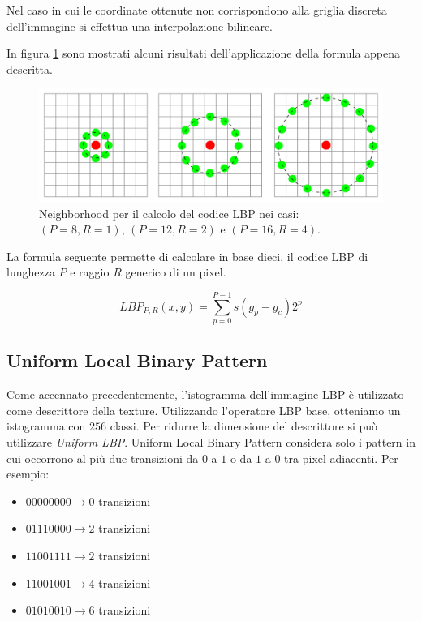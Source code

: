 Nel caso in cui le coordinate ottenute non corrispondono alla griglia discreta dell'immagine si effettua una interpolazione bilineare.

In figura \ref{fig:NeighborhoodLBP} sono mostrati alcuni risultati dell'applicazione della formula appena descritta. \\

\begin{figure}[ht]
\begin{center}
\includegraphics[width=.95\textwidth]{img/raggio_LBP}
\caption{ Neighborhood per il calcolo del codice LBP nei casi: $(P=8, R=1)$, $(P=12, R=2)$ e $(P=16, R=4)$. }
\label{fig:NeighborhoodLBP}
\end{center}
\end{figure}


La formula seguente permette di calcolare in base dieci, il codice LBP di lunghezza $P$ e raggio $R$ generico di un pixel.

\begin{equation}
LBP_{P,R}(x, y) = \sum_{p=0}^{P-1}{s(g_p - g_c)2^p}
\end{equation}

\subsection{Uniform Local Binary Pattern}
Come accennato precedentemente, l'istogramma dell'immagine LBP è utilizzato come descrittore della texture. Utilizzando l'operatore LBP base, otteniamo un istogramma con $256$ classi. Per ridurre la dimensione del descrittore si può utilizzare \textit{Uniform LBP}. Uniform Local Binary Pattern considera solo i pattern in cui occorrono al più due transizioni da $0$ a $1$ o da $1$ a $0$ tra pixel adiacenti. Per esempio:

\begin{itemize}
	\item $00000000 \rightarrow 0$ transizioni
	\item $01110000 \rightarrow 2$ transizioni
	\item $11001111 \rightarrow 2$ transizioni
	\item $11001001 \rightarrow 4$ transizioni
	\item $01010010 \rightarrow 6$ transizioni
\end{itemize}

